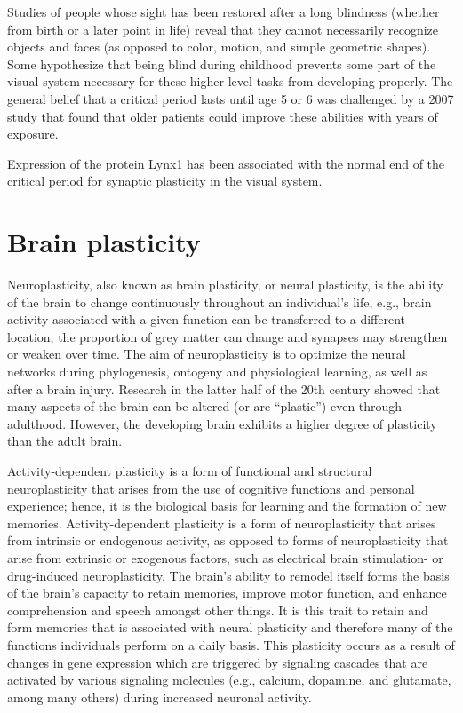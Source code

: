 Studies of people whose sight has been restored after a long blindness (whether from birth or a later point in life) reveal that they cannot necessarily recognize objects and faces (as opposed to color, motion, and simple geometric shapes). Some hypothesize that being blind during childhood prevents some part of the visual system necessary for these higher-level tasks from developing properly. The general belief that a critical period lasts until age 5 or 6 was challenged by a 2007 study that found that older patients could improve these abilities with years of exposure.

Expression of the protein Lynx1 has been associated with the normal end of the critical period for synaptic plasticity in the visual system.

\hypertarget{brain-plasticity}{%
\section{Brain plasticity}\label{brain-plasticity}}

Neuroplasticity, also known as brain plasticity, or neural plasticity, is the ability of the brain to change continuously throughout an individual's life, e.g., brain activity associated with a given function can be transferred to a different location, the proportion of grey matter can change and synapses may strengthen or weaken over time. The aim of neuroplasticity is to optimize the neural networks during phylogenesis, ontogeny and physiological learning, as well as after a brain injury. Research in the latter half of the 20th century showed that many aspects of the brain can be altered (or are ``plastic'') even through adulthood. However, the developing brain exhibits a higher degree of plasticity than the adult brain.

Activity-dependent plasticity is a form of functional and structural neuroplasticity that arises from the use of cognitive functions and personal experience; hence, it is the biological basis for learning and the formation of new memories. Activity-dependent plasticity is a form of neuroplasticity that arises from intrinsic or endogenous activity, as opposed to forms of neuroplasticity that arise from extrinsic or exogenous factors, such as electrical brain stimulation- or drug-induced neuroplasticity. The brain's ability to remodel itself forms the basis of the brain's capacity to retain memories, improve motor function, and enhance comprehension and speech amongst other things. It is this trait to retain and form memories that is associated with neural plasticity and therefore many of the functions individuals perform on a daily basis. This plasticity occurs as a result of changes in gene expression which are triggered by signaling cascades that are activated by various signaling molecules (e.g., calcium, dopamine, and glutamate, among many others) during increased neuronal activity.

